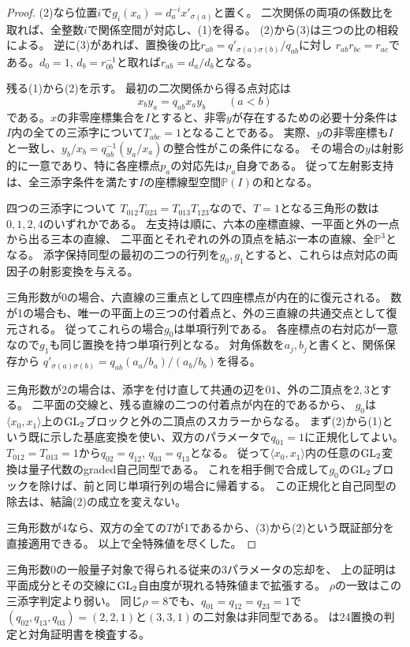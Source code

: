 \begin{proof}
(2)なら位置$i$で$g_i(x_a)=d_a^{-i}x'_{\sigma(a)}$と置く。
二次関係の両項の係数比を取れば、全整数$i$で関係空間が対応し、(1)を得る。
(2)から(3)は三つの比の相殺による。
逆に(3)があれば、置換後の比$r_{ab}=q'_{\sigma(a)\sigma(b)}/q_{ab}$に対し
$r_{ab}r_{bc}=r_{ac}$である。$d_0=1$, $d_b=r_{0b}^{-1}$と取れば$r_{ab}=d_a/d_b$となる。

残る(1)から(2)を示す。
最初の二次関係から得る点対応は
\[
 x_by_a=q_{ab}x_ay_b\qquad(a<b)
\]
である。$x$の非零座標集合を$I$とすると、非零$y$が存在するための必要十分条件は
$I$内の全ての三添字について$T_{abc}=1$となることである。
実際、$y$の非零座標も$I$と一致し、$y_b/x_b=q_{ab}^{-1}(y_a/x_a)$の整合性がこの条件になる。
その場合の$y$は射影的に一意であり、特に各座標点$p_a$の対応先は$p_a$自身である。
従って左射影支持は、全三添字条件を満たす$I$の座標線型空間$\mathbb P(I)$の和となる。

四つの三添字について
$T_{012}T_{023}=T_{013}T_{123}$なので、$T=1$となる三角形の数は$0,1,2,4$のいずれかである。
左支持は順に、六本の座標直線、一平面と外の一点から出る三本の直線、
二平面とそれぞれの外の頂点を結ぶ一本の直線、全$\mathbb P^3$となる。
添字保持同型の最初の二つの行列を$g_0,g_1$とすると、これらは点対応の両因子の射影変換を与える。

三角形数が0の場合、六直線の三重点として四座標点が内在的に復元される。
数が1の場合も、唯一の平面上の三つの付着点と、外の三直線の共通交点として復元される。
従ってこれらの場合$g_0$は単項行列である。
各座標点の右対応が一意なので$g_1$も同じ置換を持つ単項行列となる。
対角係数を$a_j,b_j$と書くと、関係保存から
$q'_{\sigma(a)\sigma(b)}=q_{ab}(a_a/b_a)/(a_b/b_b)$を得る。

三角形数が2の場合は、添字を付け直して共通の辺を$01$、外の二頂点を$2,3$とする。
二平面の交線と、残る直線の二つの付着点が内在的であるから、
$g_0$は$\langle x_0,x_1\rangle$上の$\operatorname{GL}_2$ブロックと外の二頂点のスカラーからなる。
まず(2)から(1)という既に示した基底変換を使い、双方のパラメータで$q_{01}=1$に正規化してよい。
$T_{012}=T_{013}=1$から$q_{02}=q_{12}$, $q_{03}=q_{13}$となる。
従って$\langle x_0,x_1\rangle$内の任意の$\operatorname{GL}_2$変換は量子代数のgraded自己同型である。
これを相手側で合成して$g_0$の$\operatorname{GL}_2$ブロックを除けば、前と同じ単項行列の場合に帰着する。
この正規化と自己同型の除去は、結論(2)の成立を変えない。

三角形数が4なら、双方の全ての$T$が1であるから、(3)から(2)という既証部分を直接適用できる。
以上で全特殊値を尽くした。
\end{proof}
\begin{remark}
三角形数0の一般量子対象で得られる従来の3パラメータの忘却を、
上の証明は平面成分とその交線に$\operatorname{GL}_2$自由度が現れる特殊値まで拡張する。
$\rho$の一致はこの三添字判定より弱い。
同じ$\rho=8$でも、$q_{01}=q_{12}=q_{23}=1$で
$(q_{02},q_{13},q_{03})=(2,2,1)$と$(3,3,1)$の二対象は非同型である。
は24置換の判定と対角証明書を検査する。
\end{remark}
